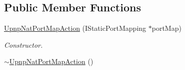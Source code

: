 \subsection*{Public Member Functions}
\begin{DoxyCompactItemize}
\item 
\hyperlink{class_upnp_nat_port_map_action_a0ef46fd4ff0699c3276230ccebfe3055}{UpnpNatPortMapAction} (IStaticPortMapping $\ast$portMap)
\begin{DoxyCompactList}\small\item\em Constructor. \item\end{DoxyCompactList}\item 
\hypertarget{class_upnp_nat_port_map_action_aa9dd473b6a834eab9ba18bc557828c65}{
\hyperlink{class_upnp_nat_port_map_action_aa9dd473b6a834eab9ba18bc557828c65}{$\sim$UpnpNatPortMapAction} ()}
\label{class_upnp_nat_port_map_action_aa9dd473b6a834eab9ba18bc557828c65}


\end{DoxyCompactItemize}
